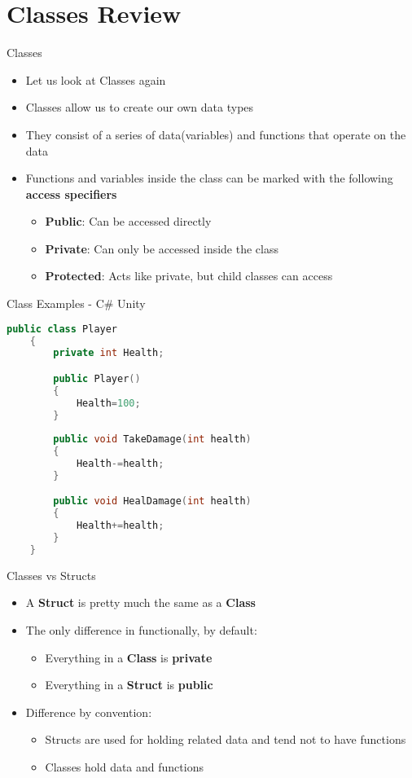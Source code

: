 \part{Classes Review}
\frame{\partpage}

\begin{frame}{Classes}
	\begin{itemize}
		\pause \item Let us look at Classes again
		\pause \item Classes allow us to create our own data types
		\pause \item They consist of a series of data(variables) and functions that operate on the data
		\pause \item Functions and variables inside the class can be marked with the following \textbf{access specifiers}
		\begin{itemize}
			\pause \item \textbf{Public}: Can be accessed directly
			\pause \item \textbf{Private}: Can only be accessed inside the class
			\pause \item \textbf{Protected}: Acts like private, but child classes can access
		\end{itemize}
	\end{itemize}
\end{frame}


\begin{frame}[fragile]{Class Examples - C\# Unity}
\begin{lstlisting}[language=C++,basicstyle=\tiny,]
	public class Player
	{
		private int Health;

		public Player()
		{
			Health=100;
		}
		
		public void TakeDamage(int health)
		{
			Health-=health;
		}

		public void HealDamage(int health)
		{
			Health+=health;
		}
	}
\end{lstlisting}
\end{frame}

\begin{frame}{Classes vs Structs}
\begin{itemize}
	\pause \item A \textbf{Struct} is pretty much the same as a \textbf{Class}
	\pause \item The only difference in functionally, by default:
	\begin{itemize}
		\pause \item Everything in a \textbf{Class} is \textbf{private}
		\pause \item Everything in a \textbf{Struct} is \textbf{public}
	\end{itemize}
	\pause \item Difference by convention:
	\begin{itemize}
		\pause \item Structs are used for holding related data and tend not to have functions
		\pause \item Classes hold data and functions
	\end{itemize}
\end{itemize}
\end{frame}

